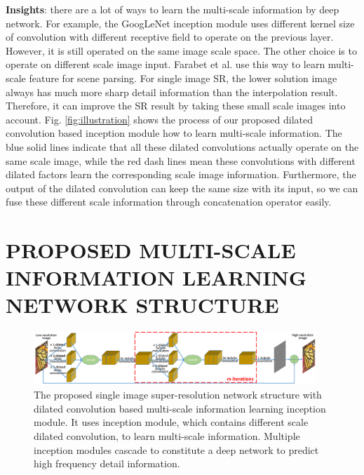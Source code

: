 \documentclass{article}
\begin{document}
\textbf{Insights}: there are a lot of ways to learn the multi-scale information by deep network. For example, the GoogLeNet inception module uses different kernel size of convolution with different receptive field to operate on the previous layer. However, it is still operated on the same image scale space. The other choice is to operate on different scale image input. Farabet et al. \cite{ref15} use this way to learn multi-scale feature for scene parsing. For single image SR, the lower solution image always has much more sharp detail information than the interpolation result. Therefore, it can improve the SR result by taking these small scale images into account. Fig. \ref{fig:illustration} shows the process of our proposed dilated convolution based inception module how to learn multi-scale information. The blue solid lines indicate that all these dilated convolutions actually operate on the same scale image, while the red dash lines mean these convolutions with different dilated factors learn the corresponding scale image information. Furthermore, the output of the dilated convolution can keep the same size with its input, so we can fuse these different scale information through concatenation operator easily.

\section{PROPOSED MULTI-SCALE INFORMATION LEARNING NETWORK STRUCTURE}
\label{sec:proposed}

\begin{figure}[htb]

\begin{minipage}[b]{1.0\linewidth}
  \centering
  \centerline{\includegraphics[width=0.95\textwidth]{MSSRNet_framework.png}}
\end{minipage}
\vspace{-0.9cm}
\caption{The proposed single image super-resolution network structure with dilated convolution based multi-scale information learning inception module. It uses inception module, which contains different scale dilated convolution, to learn multi-scale information. Multiple inception modules cascade to constitute a deep network to predict high frequency detail information.}
\label{fig:networkframework}
\vspace{-0.4cm}
%
\end{figure}
\end{document}
